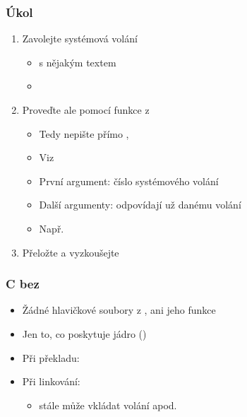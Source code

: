 \begin{frame}
  \frametitle{Úkol}

  \begin{enumerate}
    \item Zavolejte systémová volání
    \begin{itemize}
      \item {} s nějakým textem
      \item {}
    \end{itemize}

    \item Proveďte ale pomocí funkce  z 
    \begin{itemize}
      \item Tedy nepište přímo , 
      \item Viz 
      \item První argument: číslo systémového volání
      \item Další argumenty: odpovídají už danému volání
      \item Např.\ 
    \end{itemize}

    \item Přeložte a vyzkoušejte
  \end{enumerate}

\end{frame}

\begin{frame}
  \frametitle{C bez }

  \begin{itemize}
    \item Žádné hlavičkové soubory z , ani jeho funkce
    \item Jen to, co poskytuje jádro ()
    \item Při překladu: 
    \item Při linkování: 
    \begin{itemize}
      \item {} stále může vkládat volání  apod.
    \end{itemize}
  \end{itemize}

\end{frame}

